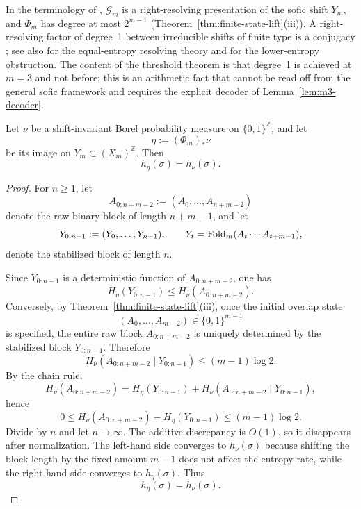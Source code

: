 \begin{remark}\label{rem:sofic-comparison}
In the terminology of \cite{LindMarcus1995}, $\mathcal{G}_m$ is a right-resolving presentation of the sofic shift $Y_m$, and $\Phi_m$ has degree at most $2^{m-1}$ (Theorem~\ref{thm:finite-state-lift}(iii)). A right-resolving factor of degree~1 between irreducible shifts of finite type is a conjugacy \cite[Theorem~8.1.16]{LindMarcus1995}; see also \cite{Ashley1988} for the equal-entropy resolving theory and \cite{Boyle1983} for the lower-entropy obstruction. The content of the threshold theorem is that degree~1 is achieved at $m=3$ and not before; this is an arithmetic fact that cannot be read off from the general sofic framework and requires the explicit decoder of Lemma~\ref{lem:m3-decoder}.
\end{remark}

\begin{proposition}\label{prop:measure-entropy-preservation}
Let $\nu$ be a shift-invariant Borel probability measure on $\{0,1\}^{\mathbb Z}$, and let
\[
\eta:=(\Phi_m)_*\nu
\]
be its image on $Y_m\subset (X_m)^{\mathbb Z}$. Then
\[
h_\eta(\sigma)=h_\nu(\sigma).
\]
\end{proposition}

\begin{proof}
For $n\ge 1$, let
\[
A_{0:n+m-2}:=(A_0,\dots,A_{n+m-2})
\]
denote the raw binary block of length $n+m-1$, and let
\[
Y_{0:n-1}:=(Y_0,\dots,Y_{n-1}),\qquad Y_t=\mathrm{Fold}_m(A_t\cdots A_{t+m-1}),
\]
denote the stabilized block of length $n$.

Since $Y_{0:n-1}$ is a deterministic function of $A_{0:n+m-2}$, one has
\[
H_\eta(Y_{0:n-1})\le H_\nu(A_{0:n+m-2}).
\]
Conversely, by Theorem~\ref{thm:finite-state-lift}(iii), once the initial overlap state
\[
(A_0,\dots,A_{m-2})\in\{0,1\}^{m-1}
\]
is specified, the entire raw block $A_{0:n+m-2}$ is uniquely determined by the stabilized block $Y_{0:n-1}$. Therefore
\[
H_\nu(A_{0:n+m-2}\mid Y_{0:n-1})\le (m-1)\log 2.
\]
By the chain rule,
\[
H_\nu(A_{0:n+m-2})
=
H_\eta(Y_{0:n-1})
+
H_\nu(A_{0:n+m-2}\mid Y_{0:n-1}),
\]
hence
\[
0\le H_\nu(A_{0:n+m-2})-H_\eta(Y_{0:n-1})\le (m-1)\log 2.
\]
Divide by $n$ and let $n\to\infty$. The additive discrepancy is $O(1)$, so it disappears after normalization. The left-hand side converges to $h_\nu(\sigma)$ because shifting the block length by the fixed amount $m-1$ does not affect the entropy rate, while the right-hand side converges to $h_\eta(\sigma)$. Thus
\[
h_\eta(\sigma)=h_\nu(\sigma).
\]
\end{proof}


